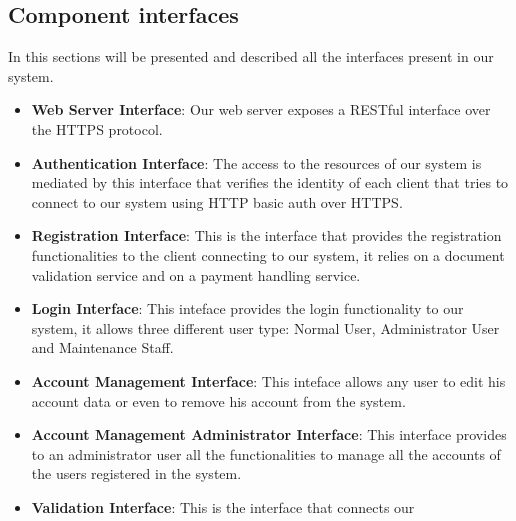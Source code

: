\subsection{Component interfaces}
In this sections will be presented and described all the interfaces present in
our system.

\begin{itemize}
  \item \textbf{Web Server Interface}: Our web server exposes a RESTful
                                       interface over the HTTPS protocol.
  \item \textbf{Authentication Interface}: The access to the resources of our
                                           system is mediated by this interface
                                           that verifies the identity of each
                                           client that tries to connect to our
                                           system using HTTP basic auth over
                                           HTTPS.
  \item \textbf{Registration Interface}: This is the interface that provides
                                         the registration functionalities to the
                                         client connecting to our system, it
                                         relies on a document validation service
                                         and on a payment handling service.
  \item \textbf{Login Interface}: This inteface provides the login
                                  functionality to our system, it allows three
                                  different user type: Normal User,
                                  Administrator User and Maintenance Staff.
  \item \textbf{Account Management Interface}: This inteface allows any user to
                                               edit his account data or even to
                                               remove his account from the
                                               system.
 \item \textbf{Account Management Administrator Interface}: This interface
                                      provides to an administrator user all the
                                      functionalities to manage all the accounts
                                      of the users registered in the system.
  \item \textbf{Validation Interface}: This is the interface that connects our

\end{itemize}
